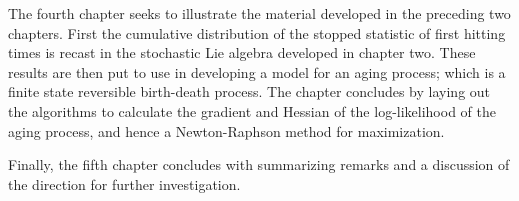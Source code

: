 The fourth chapter seeks to illustrate the material developed in the preceding two chapters.
First the cumulative distribution of the stopped statistic of first hitting times is recast 
in the stochastic Lie algebra developed in chapter two. These results are then put to use in
developing a model for an aging process; which is a finite state reversible birth-death
process. The chapter concludes by laying out the algorithms to calculate the gradient and
Hessian of the log-likelihood of the aging process, and hence a Newton-Raphson method for
maximization.

Finally, the fifth chapter concludes with summarizing remarks and a discussion of the
direction for further investigation.